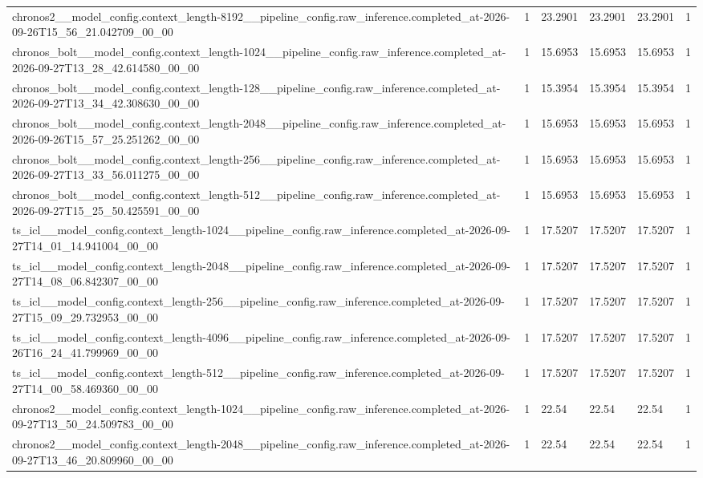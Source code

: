 \begin{tabular}{llllll}
chronos2\_\_model\_config.context\_length-8192\_\_pipeline\_config.raw\_inference.completed\_at-2026-09-26T15\_56\_21.042709\_00\_00 & 1 & 23.2901 & 23.2901 & 23.2901 & 1 \\
chronos\_bolt\_\_model\_config.context\_length-1024\_\_pipeline\_config.raw\_inference.completed\_at-2026-09-27T13\_28\_42.614580\_00\_00 & 1 & 15.6953 & 15.6953 & 15.6953 & 1 \\
chronos\_bolt\_\_model\_config.context\_length-128\_\_pipeline\_config.raw\_inference.completed\_at-2026-09-27T13\_34\_42.308630\_00\_00 & 1 & 15.3954 & 15.3954 & 15.3954 & 1 \\
chronos\_bolt\_\_model\_config.context\_length-2048\_\_pipeline\_config.raw\_inference.completed\_at-2026-09-26T15\_57\_25.251262\_00\_00 & 1 & 15.6953 & 15.6953 & 15.6953 & 1 \\
chronos\_bolt\_\_model\_config.context\_length-256\_\_pipeline\_config.raw\_inference.completed\_at-2026-09-27T13\_33\_56.011275\_00\_00 & 1 & 15.6953 & 15.6953 & 15.6953 & 1 \\
chronos\_bolt\_\_model\_config.context\_length-512\_\_pipeline\_config.raw\_inference.completed\_at-2026-09-27T15\_25\_50.425591\_00\_00 & 1 & 15.6953 & 15.6953 & 15.6953 & 1 \\
ts\_icl\_\_model\_config.context\_length-1024\_\_pipeline\_config.raw\_inference.completed\_at-2026-09-27T14\_01\_14.941004\_00\_00 & 1 & 17.5207 & 17.5207 & 17.5207 & 1 \\
ts\_icl\_\_model\_config.context\_length-2048\_\_pipeline\_config.raw\_inference.completed\_at-2026-09-27T14\_08\_06.842307\_00\_00 & 1 & 17.5207 & 17.5207 & 17.5207 & 1 \\
ts\_icl\_\_model\_config.context\_length-256\_\_pipeline\_config.raw\_inference.completed\_at-2026-09-27T15\_09\_29.732953\_00\_00 & 1 & 17.5207 & 17.5207 & 17.5207 & 1 \\
ts\_icl\_\_model\_config.context\_length-4096\_\_pipeline\_config.raw\_inference.completed\_at-2026-09-26T16\_24\_41.799969\_00\_00 & 1 & 17.5207 & 17.5207 & 17.5207 & 1 \\
ts\_icl\_\_model\_config.context\_length-512\_\_pipeline\_config.raw\_inference.completed\_at-2026-09-27T14\_00\_58.469360\_00\_00 & 1 & 17.5207 & 17.5207 & 17.5207 & 1 \\
chronos2\_\_model\_config.context\_length-1024\_\_pipeline\_config.raw\_inference.completed\_at-2026-09-27T13\_50\_24.509783\_00\_00 & 1 & 22.54 & 22.54 & 22.54 & 1 \\
chronos2\_\_model\_config.context\_length-2048\_\_pipeline\_config.raw\_inference.completed\_at-2026-09-27T13\_46\_20.809960\_00\_00 & 1 & 22.54 & 22.54 & 22.54 & 1 \\

\end{tabular}
